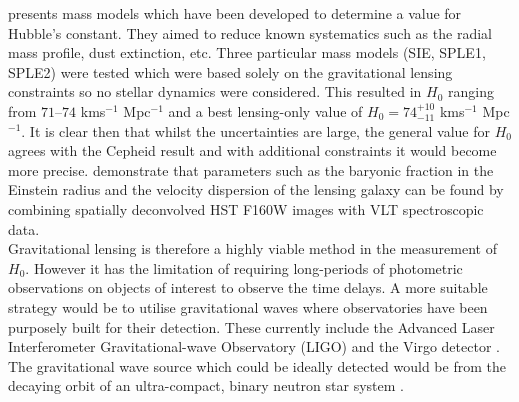\documentclass[12pt, onecolumn]{revtex4}    %
\begin{document}
\cite{2003ApJ...599...70K} presents mass models which have been developed to determine a value for Hubble's constant. They aimed to reduce known systematics such as the radial mass profile, dust extinction, etc. Three particular mass models (SIE, SPLE1, SPLE2) were tested which were based solely on the gravitational lensing constraints so no stellar dynamics were considered. This resulted in $H_0$ ranging from $71$--$74$ kms$^{-1}$ Mpc$^{-1}$ and a best lensing-only value of $H_0=74^{+10}_{-11}$ kms$^{-1}$ Mpc$^{-1}$. It is clear then that whilst the uncertainties are large, the general value for $H_0$ agrees with the Cepheid result and with additional constraints it would become more precise. \cite{2011A&A...536A..53C} demonstrate that parameters such as the baryonic fraction in the Einstein radius and the velocity dispersion of the lensing galaxy can be found by combining spatially deconvolved HST F160W images with VLT spectroscopic data. \\

Gravitational lensing is therefore a highly viable method in the measurement of $H_0$. However it has the limitation of requiring long-periods of photometric observations on objects of interest to observe the time delays. A more suitable strategy would be to utilise gravitational waves where observatories have been purposely built for their detection. These currently include the Advanced Laser Interferometer Gravitational-wave Observatory (LIGO) \citep{2015CQGra..32g4001L} and the Virgo detector \citep{2015CQGra..32b4001A}. \\

The gravitational wave source which could be ideally detected would be from the decaying orbit of an ultra-compact, binary neutron star system \citep{Schutz:1986aa}.  \\


\end{document}
